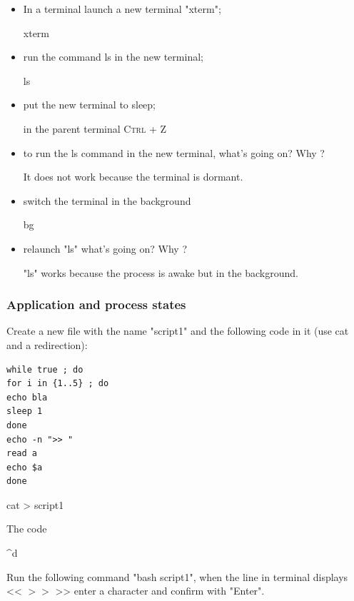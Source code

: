 \documentclass[11pt]{article}
\begin{document}
\begin{itemize}
	\item In a terminal launch a new terminal "xterm";
	\begin{solution}
		xterm
	\end{solution}
	\item run the command ls  in the new terminal;
	\begin{solution}
		ls
	\end{solution}
	\item put the new terminal to sleep;
	\begin{solution}
		in the parent terminal \textsc{Ctrl + Z}
	\end{solution}
	\item to run the ls command in the new terminal, what's going on? Why ?
	\begin{solution}
		It does not work because the terminal is dormant.
	\end{solution}
	\item switch the terminal in the background
	\begin{solution}
		bg
	\end{solution}
	\item relaunch "ls" what's going on? Why ?
	\begin{solution}
		"ls" works because the process is awake but in the background.
	\end{solution}
\end{itemize}

\subsubsection{Application and process states}

Create a new file with the name "script1" and the following code in it (use cat and a redirection):

\begin{lstlisting}
while true ; do
for i in {1..5} ; do
echo bla
sleep 1
done
echo -n ">> "
read a
echo $a
done
\end{lstlisting}

\begin{solution}
	
	cat > script1
	
	The code
	
	\^{}d
	
\end{solution}

Run the following command "bash script1", when the line in terminal displays << $ >> $ >> enter a character and confirm with "Enter".
\end{document}
